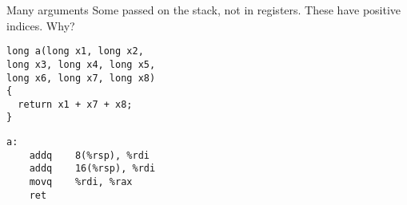 \documentclass[landscape]{beamer}
\begin{document}
\begin{frame}[fragile]{Many arguments}
Some passed on the stack, not in registers. These have positive indices. Why?
\\[2em]

\begin{minipage}{.6\textwidth}
\begin{verbatim}
long a(long x1, long x2, 
long x3, long x4, long x5, 
long x6, long x7, long x8)
{
  return x1 + x7 + x8;
}
\end{verbatim}
\end{minipage}
%
\begin{minipage}{.3\textwidth}
\begin{verbatim}
a:                             
	addq	8(%rsp), %rdi
	addq	16(%rsp), %rdi
	movq	%rdi, %rax
	ret
\end{verbatim}
\end{minipage}
\end{frame}
\end{document}
